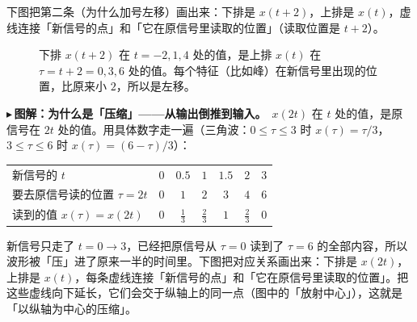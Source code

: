 \documentclass[UTF8,a4paper,11pt]{ctexart}
\newcounter{ex}[section]
\newcommand{\point}[1]{\par\addvspace{1ex}\noindent\textcolor{ptteal}{$\blacktriangleright$\,\textbf{#1}}\ }
\renewcommand{\paragraph}[1]{\point{#1}}
\begin{document}
下图把第二条（为什么加号左移）画出来：下排是 $x(t+2)$，上排是 $x(t)$，虚线连接「新信号的点」和「它在原信号里读取的位置」（读取位置是 $t+2$）。

\begin{figure}[H]
\centering
{}
\caption{下排 $x(t+2)$ 在 $t=-2,1,4$ 处的值，是上排 $x(t)$ 在 $\tau=t+2=0,3,6$ 处的值。每个特征（比如峰）在新信号里出现的位置，比原来小 $2$，所以是左移。}
\end{figure}

\paragraph{图解：为什么是「压缩」——从输出倒推到输入。}$x(2t)$ 在 $t$ 处的值，是原信号在 $2t$ 处的值。用具体数字走一遍（三角波：$0\le\tau\le3$ 时 $x(\tau)=\tau/3$，$3\le\tau\le6$ 时 $x(\tau)=(6-\tau)/3$）：
\begin{center}
\begin{tabular}{@{}lcccccc@{}}
\toprule
新信号的 $t$ & $0$ & $0.5$ & $1$ & $1.5$ & $2$ & $3$ \\
要去原信号读的位置 $\tau=2t$ & $0$ & $1$ & $2$ & $3$ & $4$ & $6$ \\
读到的值 $x(\tau)=x(2t)$ & $0$ & $\tfrac13$ & $\tfrac23$ & $1$ & $\tfrac23$ & $0$ \\
\bottomrule
\end{tabular}
\end{center}
新信号只走了 $t=0\to3$，已经把原信号从 $\tau=0$ 读到了 $\tau=6$ 的全部内容，所以波形被「压」进了原来一半的时间里。下图把对应关系画出来：下排是 $x(2t)$，上排是 $x(t)$，每条虚线连接「新信号的点」和「它在原信号里读取的位置」。把这些虚线向下延长，它们会交于纵轴上的同一点（图中的「放射中心」），这就是「以纵轴为中心的压缩」。
\end{document}

